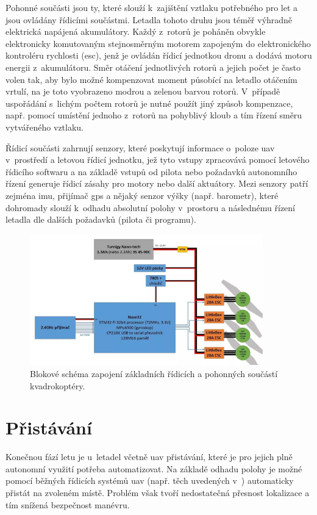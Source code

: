 Pohonné součásti jsou ty, které slouží k~zajištění vztlaku potřebného pro let a jsou ovládány řídicími součástmi. Letadla tohoto druhu jsou téměř výhradně elektrická napájená akumulátory. Každý z~rotorů je poháněn obvykle elektronicky komutovaným stejnosměrným motorem zapojeným do elektronického kontroléru rychlosti (\acrshort{esc}), jenž je ovládán řídicí jednotkou dronu a dodává motoru energii z~akumulátoru. Směr otáčení jednotlivých rotorů a jejich počet je často volen tak, aby bylo možné kompenzovat moment působící na letadlo otáčením vrtulí, na  je toto vyobrazeno modrou a zelenou barvou rotorů. V~případě uspořádání s~lichým počtem rotorů je nutné použít jiný způsob kompenzace, např. pomocí umístění jednoho z~rotorů na pohyblivý kloub a tím řízení směru vytvářeného vztlaku.

Řídicí součásti zahrnují senzory, které poskytují informace o~poloze \acrshort{uav} v~prostředí a letovou řídicí jednotku, jež tyto vstupy zpracovává pomocí letového řídicího softwaru a na základě vstupů od pilota nebo požadavků autonomního řízení generuje řídicí zásahy pro motory nebo další aktuátory. Mezi senzory patří zejména \acrfull{imu}, přijímač \acrshort{gps} a nějaký senzor výšky (např. barometr), které dohromady slouží k~odhadu absolutní polohy v~prostoru a následnému řízení letadla dle dalších požadavků (pilota či programu).

\begin{figure}
    \centering
    \includegraphics[width=0.9\textwidth]{img/intro/schema-kvadrokoptera.png}
    \caption[Schéma zapojení součástí letadla]{Blokové schéma zapojení základních řídicích a pohonných součástí kvadrokoptéry. \cite{dronSoucasti}}
    \label{fig:dronSoucasti}
\end{figure}

\section{Přistávání}
Konečnou fází letu je u~letadel včetně \acrshort{uav} přistávání, které je pro jejich plně autonomní využití potřeba automatizovat. Na základě odhadu polohy je možné pomocí běžných řídicích systémů \acrshort{uav} (např. těch uvedených v~) automaticky přistát na zvoleném místě. Problém však tvoří nedostatečná přesnost lokalizace a tím snížená bezpečnost manévru.

